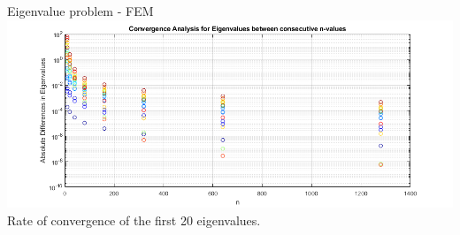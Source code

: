 \documentclass{beamer}
\begin{document}
\begin{frame}{Eigenvalue problem - FEM}
    \centering
    \includegraphics[scale=0.45]{Convergence.png} \\ %
    \footnotesize Rate of convergence of the first 20 eigenvalues.
    \label{fig:conv}
\end{frame}
\end{document}
